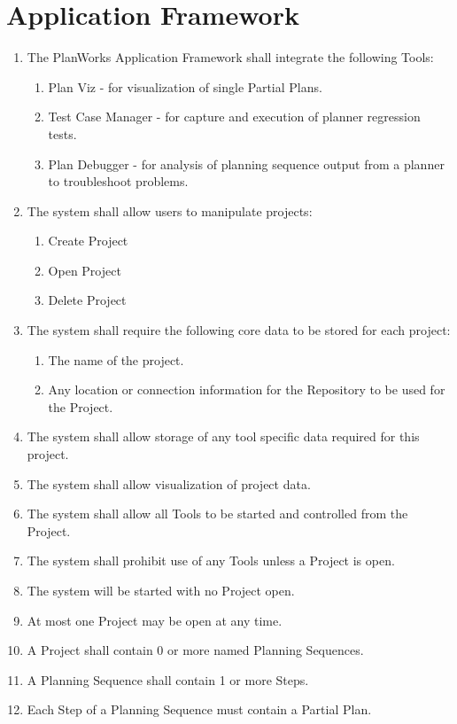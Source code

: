 \documentclass[twoside, 11pt]{article}
\begin{document}
\section{Application Framework}
\begin{enumerate}
\item The PlanWorks Application Framework shall integrate the following Tools:
\begin{enumerate}
\item Plan Viz - for visualization of single Partial Plans.
\item Test Case Manager - for capture and execution of planner regression tests.
\item Plan Debugger - for analysis of planning sequence output from a planner to troubleshoot problems.
\end{enumerate}
\item The system shall allow users to manipulate projects:
\begin{enumerate}
\item Create Project
\item Open Project
\item Delete Project
\end{enumerate}
\item The system shall require the following core data to be stored for each project:
\begin{enumerate}
\item The name of the project. 
\item Any location or connection information for the Repository to be used for the Project.
\end{enumerate}
\item The system shall allow storage of any tool specific data required for this project.
\item The system shall allow visualization of project data.
\item The system shall allow all Tools to be started and controlled from the Project.
\item The system shall prohibit use of any Tools unless a Project is open.
\item The system will be started with no Project open.
\item At most one Project may be open at any time.
\item A Project shall contain 0 or more named Planning Sequences.
\item A Planning Sequence shall contain 1 or more Steps.
\item Each Step of a Planning Sequence must contain a Partial Plan.

\end{enumerate}
\end{document}
